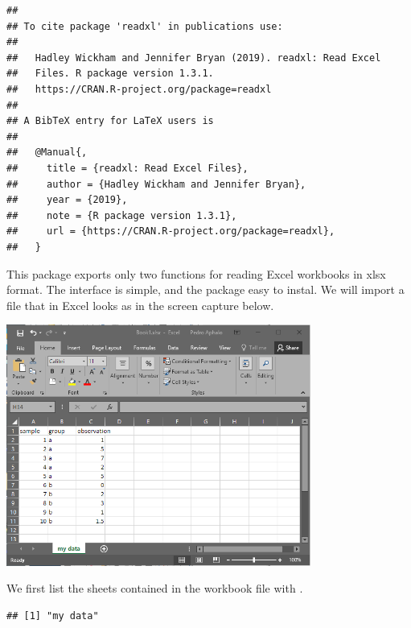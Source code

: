 \documentclass[krantz2]{krantz}\usepackage{knitr}%
\begin{document}
\begin{knitrout}\footnotesize
{}\color{fgcolor}\begin{kframe}
\begin{alltt}
\hlstd{(} \hlstd{=} \hlstd{)}
\end{alltt}
\begin{verbatim}
## 
## To cite package 'readxl' in publications use:
## 
##   Hadley Wickham and Jennifer Bryan (2019). readxl: Read Excel
##   Files. R package version 1.3.1.
##   https://CRAN.R-project.org/package=readxl
## 
## A BibTeX entry for LaTeX users is
## 
##   @Manual{,
##     title = {readxl: Read Excel Files},
##     author = {Hadley Wickham and Jennifer Bryan},
##     year = {2019},
##     note = {R package version 1.3.1},
##     url = {https://CRAN.R-project.org/package=readxl},
##   }
\end{verbatim}
\end{kframe}
\end{knitrout}

This package exports only two functions for reading Excel workbooks in xlsx format. The interface is simple, and the package easy to instal. We will import a file that in Excel looks as in the screen capture below.

\begin{center}
\includegraphics[width=0.75\textwidth]{figures/Book1-xlsx.png}
\end{center}

We first list the sheets contained in the workbook file with .
\begin{knitrout}\footnotesize
{}\color{fgcolor}\begin{kframe}
\begin{alltt}
 \hlkwb{<-} \hlstd{(}\hlstd{)}
\end{alltt}
\begin{verbatim}
## [1] "my data"
\end{verbatim}
\end{kframe}
\end{knitrout}
\end{document}
